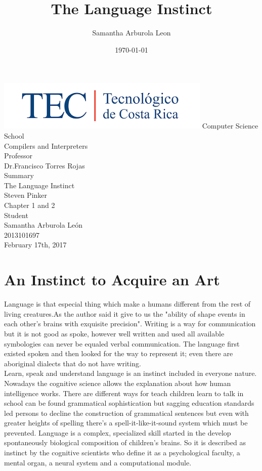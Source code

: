 \documentclass[13pt,letterpaper,onecolumn]{report}
\author{Samantha Arburola Leon}
\title{The Language Instinct}
\date{\today}
\begin{document}
\vspace{10em}
\begin{center}
\includegraphics{tec}
Computer Science School\\Compilers and Interpreters\\
\vspace{1em}
Professor\\Dr.Francisco Torres Rojas \\
\vspace{7em}
Summary \\ The Language Instinct\\Steven Pinker\\Chapter 1 and 2\\
\vspace{5em}
Student\\ Samantha Arburola Le\'on \\ 2013101697\\
\vspace{10em}
February 17th, 2017
\end{center}
\pagebreak[4]

\chapter{An Instinct to Acquire an Art}
\hspace{1em}Language is that especial thing which make a humans different from the rest of living creatures.As the author said it give to us the "ability of shape events in each other's brains with exquisite precision". Writing is a way for communication but it is not good as spoke, however well written and used all available symbologies can never be equaled verbal communication. The language first existed spoken and then looked for the way to represent it; even there are aboriginal dialects that do not have writing.\\

\hspace{1em}Learn, speak and understand language is an  instinct included in everyone nature. Nowadays the cognitive science allows the explanation about how human intelligence works. There are different ways for teach children learn to talk in school can be found grammatical sophistication but sagging education standards led persons to decline the construction of grammatical sentences but even with greater heights of spelling there's a spell-it-like-it-sound system which must be prevented. Language is a complex, specialized skill started in the develop spontaneously biological composition of children's brains. So it is described as instinct by the cognitive  scientists who define it as a psychological faculty, a mental organ, a neural system and a computational module.\\
\end{document}
